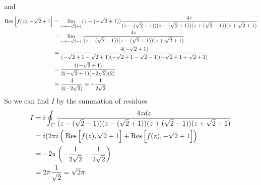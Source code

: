 \documentclass[11pt]{article}
\numberwithin{equation}{section}
\begin{document}
and
\begin{align*}
\textnormal{Res}\left[{f(z)},{-\sqrt{2}+1}\right] &= \lim_{z\rightarrow{-\sqrt{2}+1}}(z-(-\sqrt{2}+1))\frac{4z}{(z-(\sqrt{2}-1))(z-(\sqrt{2}+1))(z+(\sqrt{2}-1))(z+\sqrt{2}+1)}\\
&= \lim_{z\rightarrow{-\sqrt{2}+1}}\frac{4z}{(z-(\sqrt{2}-1))(z-(\sqrt{2}+1))(z+\sqrt{2}+1)}\\
&= \frac{4(-\sqrt{2}+1)}{(-\sqrt{2}+1-\sqrt{2}+1)(-\sqrt{2}+1-\sqrt{2}-1)(-\sqrt{2}+1+\sqrt{2}+1)}\\
&= \frac{4(-\sqrt{2}+1)}{2(-\sqrt{2}+1)(-2\sqrt{2})(2)}\\
&= \frac{4}{4(-2\sqrt{2})} = -\frac{1}{2\sqrt{2}}
\end{align*}
So we can find $I$ by the summation of residues 
\begin{align*}
I &= i\oint_{C}\frac{4zdz}{(z-(\sqrt{2}-1))(z-(\sqrt{2}+1))(z+(\sqrt{2}-1))(z+\sqrt{2}+1)}\\
&= i(2\pi{i}\left(\frac{}{}\textnormal{Res}\left[{f(z)},{\sqrt{2}+1}\right] + \textnormal{Res}\left[{f(z)},{-\sqrt{2}+1}\right]\right)\\
&= -2\pi\left(-\frac{1}{2\sqrt{2}}-\frac{1}{2\sqrt{2}}\right)\\
&= 2\pi\frac{1}{\sqrt{2}} = \sqrt{2}\pi
\end{align*}
\end{document}
